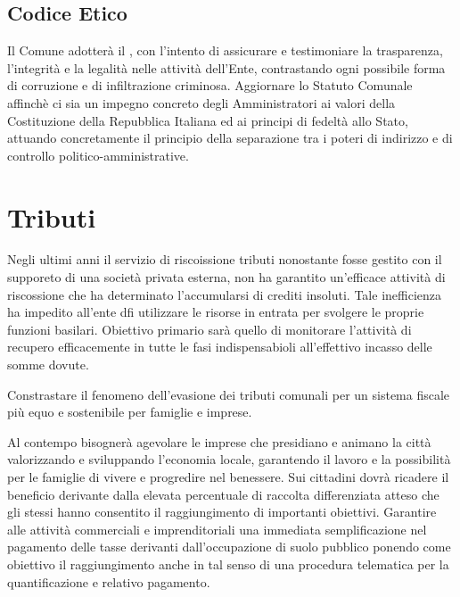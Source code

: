 \documentclass[a4paper,14pt,italian]{sphinxmanual}
\begin{document}
\section{Codice Etico}
\label{\detokenize{trasparenza:codice-etico}}
Il Comune adotterà il , con l’intento di assicurare e testimoniare la trasparenza, l’integrità e la legalità nelle attività dell’Ente, contrastando ogni possibile forma di corruzione e di infiltrazione criminosa.
Aggiornare lo Statuto Comunale affinchè ci sia un impegno concreto degli Amministratori ai valori della Costituzione della Repubblica Italiana ed ai principi di fedeltà allo Stato, attuando concretamente il principio della separazione tra i poteri di indirizzo e di controllo politico-amministrative.


\chapter{Tributi}
\label{\detokenize{tributi:tributi}}\label{\detokenize{tributi::doc}}

Negli ultimi anni il servizio di riscoissione tributi nonostante fosse gestito con il supporeto di una società privata esterna, non ha garantito un’efficace attività di riscossione che ha determinato l’accumularsi di crediti insoluti.
Tale inefficienza ha impedito all’ente dfi utilizzare le risorse in entrata per svolgere le proprie funzioni basilari.
Obiettivo primario sarà quello di monitorare l’attività di recupero efficacemente in tutte le fasi indispensabioli all’effettivo incasso delle somme dovute.

Constrastare il fenomeno dell’evasione dei tributi comunali per un sistema fiscale più equo e sostenibile per famiglie e imprese.

Al contempo bisognerà agevolare le imprese che presidiano e animano la città valorizzando e sviluppando l’economia locale, garantendo il lavoro e la possibilità per le famiglie di vivere e progredire nel benessere.
Sui cittadini dovrà ricadere il beneficio derivante dalla elevata percentuale di raccolta differenziata atteso che gli stessi hanno consentito il raggiungimento di importanti obiettivi.
Garantire alle attività commerciali e imprenditoriali una immediata semplificazione nel pagamento delle tasse derivanti dall’occupazione di suolo pubblico ponendo come obiettivo il raggiungimento anche in tal senso di una procedura telematica per la quantificazione e relativo pagamento.
\end{document}
